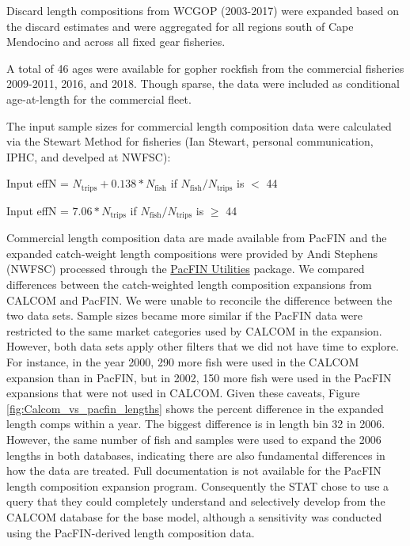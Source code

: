\documentclass[12pt,]{article}
\begin{document}
Discard length compositions from WCGOP (2003-2017) were expanded based
on the discard estimates and were aggregated for all regions south of
Cape Mendocino and across all fixed gear fisheries.

A total of 46 ages were available for gopher rockfish from the
commercial fisheries 2009-2011, 2016, and 2018. Though sparse, the data
were included as conditional age-at-length for the commercial fleet.

The input sample sizes for commercial length composition data were
calculated via the Stewart Method for fisheries (Ian Stewart, personal
communication, IPHC, and develped at NWFSC):

\begin{center}

Input effN = $N_{\text{trips}} + 0.138 * N_{\text{fish}}$ if $N_{\text{fish}}/N_{\text{trips}}$ is $<$ 44

Input effN = $7.06 * N_{\text{trips}}$ if $N_{\text{fish}}/N_{\text{trips}}$ is $\geq$ 44

\end{center}

Commercial length composition data are made available from PacFIN and
the expanded catch-weight length compositions were provided by Andi
Stephens (NWFSC) processed through the
\href{https://github.com/nwfsc-assess/PacFIN.Utilities}{PacFIN
Utilities} package. We compared differences between the catch-weighted
length composition expansions from CALCOM and PacFIN. We were unable to
reconcile the difference between the two data sets. Sample sizes became
more similar if the PacFIN data were restricted to the same market
categories used by CALCOM in the expansion. However, both data sets
apply other filters that we did not have time to explore. For instance,
in the year 2000, 290 more fish were used in the CALCOM expansion than
in PacFIN, but in 2002, 150 more fish were used in the PacFIN expansions
that were not used in CALCOM. Given these caveats, Figure
\ref{fig:Calcom_vs_pacfin_lengths} shows the percent difference in the
expanded length comps within a year. The biggest difference is in length
bin 32 in 2006. However, the same number of fish and samples were used
to expand the 2006 lengths in both databases, indicating there are also
fundamental differences in how the data are treated. Full documentation
is not available for the PacFIN length composition expansion program.
Consequently the STAT chose to use a query that they could completely
understand and selectively develop from the CALCOM database for the base
model, although a sensitivity was conducted using the PacFIN-derived
length composition data.
\end{document}
